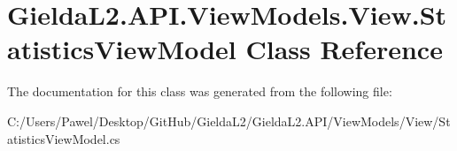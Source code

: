 \hypertarget{class_gielda_l2_1_1_a_p_i_1_1_view_models_1_1_view_1_1_statistics_view_model}{}\section{Gielda\+L2.\+A\+P\+I.\+View\+Models.\+View.\+Statistics\+View\+Model Class Reference}
\label{class_gielda_l2_1_1_a_p_i_1_1_view_models_1_1_view_1_1_statistics_view_model}


The documentation for this class was generated from the following file\+:\begin{DoxyCompactItemize}
\item 
C\+:/\+Users/\+Pawel/\+Desktop/\+Git\+Hub/\+Gielda\+L2/\+Gielda\+L2.\+A\+P\+I/\+View\+Models/\+View/Statistics\+View\+Model.\+cs\end{DoxyCompactItemize}
